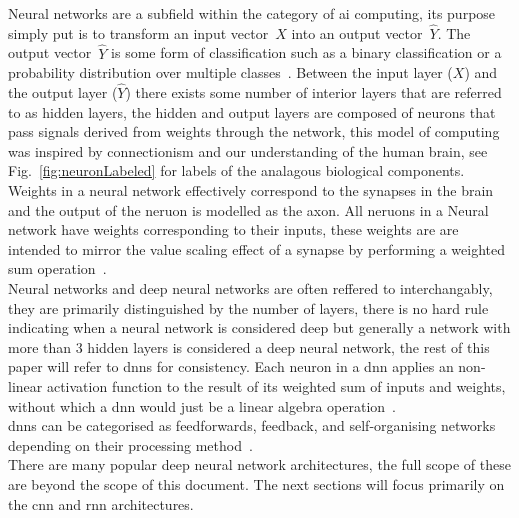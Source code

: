 \documentclass[11pt]{article}
\begin{document}
Neural networks are a subfield within the category of \Acrlong{ai} computing, its purpose simply put is to transform an input vector~$X$ into an output vector~$\hat{Y}$. The output vector~$\hat{Y}$ is some form of classification such as a binary classification or a probability distribution over multiple classes~\autocite{thierry-miegHowFundamentalConcepts}. Between the input layer ($X$) and the output layer ($\hat{Y}$) there exists some number of interior layers that are referred to as hidden layers, the hidden and output layers are composed of neurons that pass signals derived from weights through the network, this model of computing was inspired by connectionism and our understanding of the human brain, see Fig.~\ref{fig:neuronLabeled} for labels of the analagous biological components. Weights in a neural network effectively correspond to the synapses in the brain and the output of the neruon is modelled as the axon. All neruons in a Neural network have weights corresponding to their inputs, these weights are are intended to mirror the value scaling effect of a synapse by performing a weighted sum operation~\autocite{szeEfficientProcessingDeep2017}.\\
Neural networks and deep neural networks are often reffered to interchangably, they are primarily distinguished by the number of layers, there is no hard rule indicating when a neural network is considered deep but generally a network with more than 3 hidden layers is considered a deep neural network, the rest of this paper will refer to \acrshort{dnn}s for consistency. Each neuron in a \Acrshort{dnn} applies an non-linear activation function to the result of its weighted sum of inputs and weights, without which a \Acrshort{dnn} would just be a linear algebra operation~\autocite{szeEfficientProcessingDeep2017}.\\
\Acrshort{dnn}s can be categorised as feedforwards, feedback, and self-organising networks depending on their processing method~\autocite{chenDeepLearningMobile2020}.\\

There are many popular deep neural network architectures, the full scope of these are beyond the scope of this document. The next sections will focus primarily on the \Acrshort{cnn} and \Acrshort{rnn} architectures.
\end{document}
